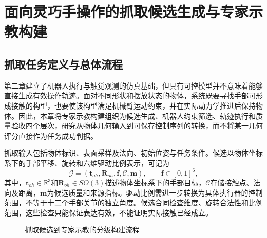 \chapter{面向灵巧手操作的抓取候选生成与专家示教构建}
\label{chap:grasp_demonstrations}

\section{抓取任务定义与总体流程}
\label{sec:grasp_task_pipeline}

第二章建立了机器人执行与触觉观测的仿真基础，但具有可控模型并不意味着能够直接生成有效操作轨迹。面对不同形状和摆放状态的物体，系统既要寻找手部可形成接触的构型，也要使该构型满足机械臂运动约束，并在实际动力学推进后保持物体。因此，本章将专家示教构建组织为候选生成、机器人约束筛选、轨迹执行和质量验收四个层次，研究从物体几何输入到可保存控制序列的转换，而不将某一几何评分直接作为任务成功判据。

抓取输入包括物体标识、表面采样及法向、初始位姿与任务条件。候选以物体坐标系下的手部平移、旋转和六维驱动比例表示，可记为
\begin{equation}
 \mathcal G=(\boldsymbol t_{oh},\boldsymbol R_{oh},\boldsymbol f,\mathcal C,\boldsymbol m),
 \qquad \boldsymbol f\in[0,1]^6,
 \label{eq:ch03_candidate}
\end{equation}
其中，$\boldsymbol t_{oh}\in\mathbb R^3$和$\boldsymbol R_{oh}\in SO(3)$描述物体坐标系下的手部目标，$\mathcal C$存储接触点、法向及距离，$\boldsymbol m$为候选质量和来源指标。驱动比例需进一步转换为具体执行器的控制范围，不等于十二个手部关节的独立角度。候选合同检查维度、旋转合法性和比例范围，这些检查只能保证表达有效，不能证明实际接触已经成立。

\begin{figure}[htbp]
 \centering
 \caption{抓取候选到专家示教的分级构建流程}
 \label{fig:ch03_overall_pipeline}
\end{figure}

